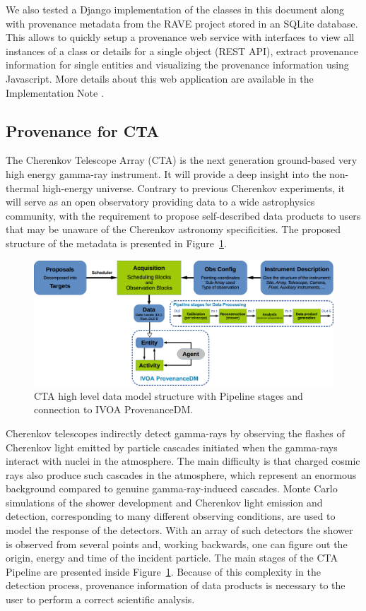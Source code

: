 We also tested a Django implementation of the classes in this document along with provenance metadata from the RAVE project stored in an SQLite database. This allows to quickly setup a provenance web service with interfaces to view all instances of a class or details for a single object (REST API), extract provenance information for single entities and visualizing the provenance information using Javascript. More details about this web application are available in the Implementation Note \citep{std:ProvenanceImplementationNote}.

\subsection{Provenance for CTA}
The Cherenkov Telescope Array (CTA) is the next generation ground-based very high energy gamma-ray instrument. It will provide a deep insight into the non-thermal high-energy universe. Contrary to previous Cherenkov experiments, it will serve as an open observatory providing data to a wide astrophysics community, with the requirement to propose self-described data products to users that may be unaware of the Cherenkov astronomy specificities. The proposed structure of the metadata is presented in Figure~\ref{fig:cta_dm}.

\begin{figure}
\centering
\includegraphics[width=\textwidth]{CTA_DM_high_level.png}
\caption[CTA high level data model structure]{CTA high level data model structure with Pipeline stages and connection to IVOA ProvenanceDM.}
\label{fig:cta_dm}
\end{figure}

Cherenkov telescopes indirectly detect gamma-rays by observing the flashes of Cherenkov light emitted by particle cascades initiated when the gamma-rays interact with nuclei in the atmosphere. The main difficulty  is that charged cosmic rays also produce such cascades in the atmosphere, which represent an enormous background compared to genuine gamma-ray-induced cascades. Monte Carlo simulations of the shower development and Cherenkov light emission and detection, corresponding to many different observing conditions, are used to model the response of the detectors.  With an array of such detectors the shower is observed  from several points and, working backwards, one can figure out the origin, energy and time of the incident particle. The main stages of the CTA Pipeline are presented inside Figure~\ref{fig:cta_dm}. Because of this complexity in the detection process, provenance information of data products is necessary to the user to perform a correct scientific analysis.

